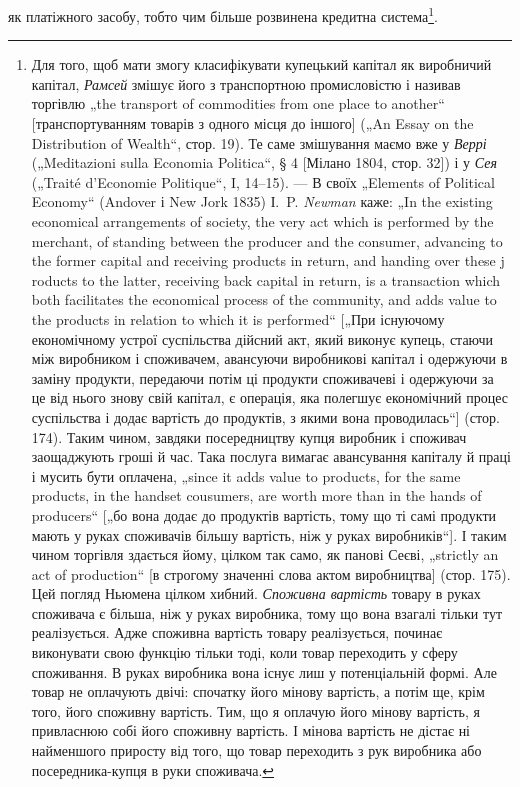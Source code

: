 як платіжного засобу, тобто чим більше розвинена кредитна система\footnote{
Для того, щоб мати змогу класифікувати купецький капітал як виробничий
капітал, \emph{Рамсей} змішує його з транспортною промисловістю і називав
торгівлю „the transport of commodities from one place to another“ [транспортуванням
товарів з одного місця до іншого] („An Essay on the Distribution of
Wealth“, стор. 19). Те саме змішування маємо вже у \emph{Веррі} („Meditazioni sulla
Economia Politica“, § 4 [Мілано 1804, стор. 32]) і у \emph{Сея} („Traité d’Economie
Politique“, I, 14--15). — В своїх „Elements of Political Economy“ (Andover і
New Jork 1835) І.~P. \emph{Newman} каже: „In the existing economical arrangements of
society, the very act which is performed by the merchant, of standing between the
producer and the consumer, advancing to the former capital and receiving products
in return, and handing over these j roducts to the latter, receiving back capital in
return, is a transaction which both facilitates the economical process of the community,
and adds value to the products in relation to which it is performed“ [„При існуючому
економічному устрої суспільства дійсний акт, який виконує купець,
стаючи між виробником і споживачем, авансуючи виробникові капітал і одержуючи
в заміну продукти, передаючи потім ці продукти споживачеві і одержуючи
за це від нього знову свій капітал, є операція, яка полегшує економічний
процес суспільства і додає вартість до продуктів, з якими вона проводилась“]
(стор. 174). Таким чином, завдяки посередництву купця виробник і споживач
заощаджують гроші й час. Така послуга вимагає авансування капіталу й праці
і мусить бути оплачена, „since it adds value to products, for the same products,
in the handset cousumers, are worth more than in the hands of producers“ [„бо вона
додає до продуктів вартість, тому що ті самі продукти мають у руках споживачів
більшу вартість, ніж у руках виробників“]. І таким чином торгівля
здається йому, цілком так само, як панові Сеєві, „strictly an act of production“
[в строгому значенні слова актом виробництва] (стор. 175). Цей погляд Ньюмена
цілком хибний. \emph{Споживна вартість} товару в руках споживача є більша, ніж у
руках виробника, тому що вона взагалі тільки тут реалізується. Адже споживна
вартість товару реалізується, починає виконувати свою функцію тільки тоді,
коли товар переходить у сферу споживання. В руках виробника вона існує лиш
у потенціальній формі. Але товар не оплачують двічі: спочатку його мінову
вартість, а потім ще, крім того, його споживну вартість. Тим, що я оплачую
його мінову вартість, я привласнюю собі його споживну вартість. І мінова вартість
не дістає ні найменшого приросту від того, що товар переходить з рук
виробника або посередника-купця в руки споживача.
}.

